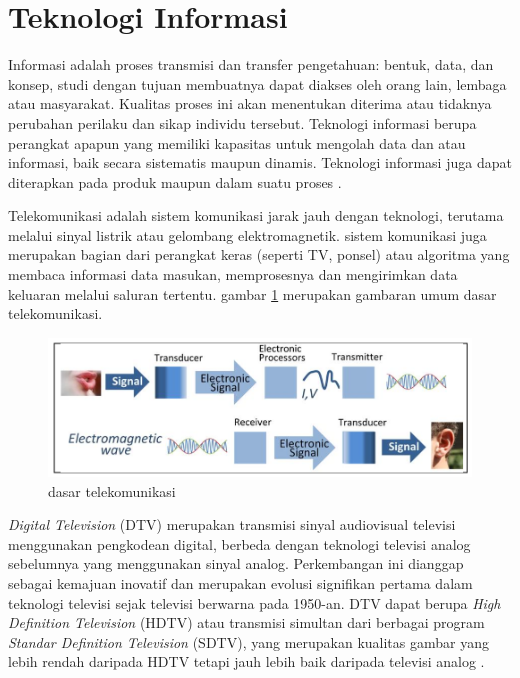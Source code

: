	
\section{Teknologi Informasi}
\hspace{1,2cm}Informasi adalah proses transmisi dan transfer pengetahuan: bentuk, data, dan konsep, studi dengan tujuan membuatnya dapat diakses oleh orang lain, lembaga atau masyarakat. Kualitas proses ini akan menentukan diterima atau tidaknya perubahan perilaku dan sikap individu tersebut. Teknologi informasi berupa perangkat apapun yang memiliki kapasitas untuk mengolah data dan atau informasi, baik secara sistematis maupun dinamis. Teknologi informasi juga dapat diterapkan pada produk maupun dalam suatu proses \citep{Victoria2020}.

Telekomunikasi adalah sistem komunikasi jarak jauh dengan teknologi, terutama melalui sinyal listrik atau gelombang elektromagnetik. sistem komunikasi juga merupakan bagian dari perangkat keras (seperti TV, ponsel) atau algoritma yang membaca informasi data masukan, memprosesnya dan mengirimkan data keluaran melalui saluran tertentu. gambar \ref{dasar telekomunikasi} merupakan gambaran umum dasar telekomunikasi.

\begin{figure}[H]
	\vspace{-0.1cm}
	\begin{center}
		\includegraphics[width=0.9\columnwidth]{bab2/Gambar/SANDY. dasar telkom.png}
	\end{center}
	\vspace{-0.2cm}
	\caption{dasar telekomunikasi \citep{ElSaba2018}}\label{dasar telekomunikasi}
\end{figure}

\textit{Digital Television} (DTV) merupakan transmisi sinyal audiovisual televisi menggunakan pengkodean digital, berbeda dengan teknologi televisi analog sebelumnya yang menggunakan sinyal analog. Perkembangan ini dianggap sebagai kemajuan inovatif dan merupakan evolusi signifikan pertama dalam teknologi televisi sejak televisi berwarna pada 1950-an. DTV dapat berupa \textit{High Definition Television} (HDTV) atau transmisi simultan dari berbagai program \textit{Standar Definition Television} (SDTV), yang merupakan kualitas gambar yang lebih rendah daripada HDTV tetapi jauh lebih baik daripada televisi analog \citep{Kruger2002}.

